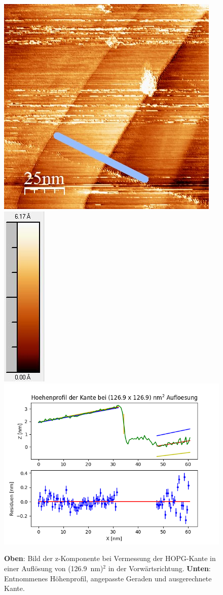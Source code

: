 \documentclass[12pt,a4paper]{article}
\begin{document}
\begin{figure}[H]
\centering
\includegraphics[scale=0.59]{Bilder/Anhang/Kante/1269_Kante_vor.jpg}
\includegraphics[scale=0.7]{Bilder/Anhang/Kante/1269_Kante_vor_Skala.jpg}
\includegraphics[scale=0.55]{Bilder/Anhang/Kante/Profil_Kante_1269_vor.png}
\caption{\textbf{Oben}: Bild der z-Komponente bei Vermessung der HOPG-Kante in einer Auflösung von (\SI{126,9}{nm})$^2$ in der Vorwärtsrichtung. \textbf{Unten}: Entnommenes Höhenprofil, angepasste Geraden und ausgerechnete Kante.}
\end{figure}
\end{document}
